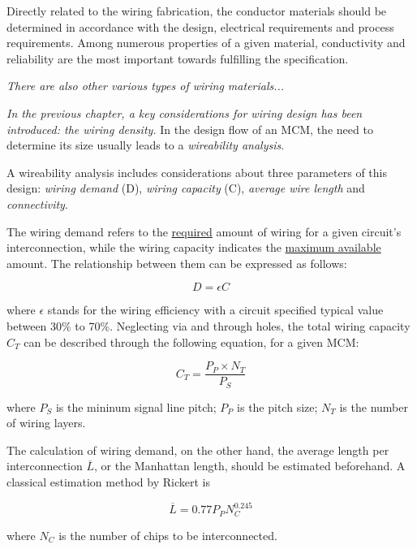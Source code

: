 \begin{spacing}{1.5}
Directly related to the wiring fabrication, the conductor materials should be determined in accordance with the design, electrical requirements and process requirements. Among numerous properties of a given material, conductivity and reliability are the most important towards fulfilling the specification. \cite{chen2006vlsi}

\textit{There are also other various types of wiring materials... }

\textit{In the previous chapter, a key considerations for wiring design has been introduced: the wiring density.} In the design flow of an MCM, the need to determine its size usually leads to a \textit{wireability analysis}. 

A wireability analysis includes considerations about three parameters of this design: \textit{wiring demand} (D), \textit{wiring capacity} (C), \textit{average wire length} and \textit{connectivity}. 

The wiring demand refers to the \underline{required} amount of wiring for a given circuit's interconnection, while the wiring capacity indicates the \underline{maximum available} amount. The relationship between them can be expressed as follows: 

\begin{equation}
    \label{eq.demand} 
    D=\epsilon C
\end{equation}

where $\epsilon$ stands for the wiring efficiency with a circuit specified typical value between 30\% to 70\%. Neglecting via and through holes, the total wiring capacity $C_T$ can be described through the following equation, for a given MCM: 

\begin{equation}
    \label{eq.capacity}
    C_T=\frac{P_P\times N_T}{P_S}
\end{equation}

where $P_S$ is the mininum signal line pitch; $P_P$ is the pitch size; $N_T$ is the number of wiring layers. 

The calculation of wiring demand, on the other hand, the average length per interconnection $\overline{L}$, or the Manhattan length, should be estimated beforehand. A classical estimation method by Rickert is 

\begin{equation}
    \label{eq.rickert}
    \overline{L}=0.77P_PN_C^{0.245}
\end{equation}

where $N_C$ is the number of chips to be interconnected. \cite{rickert1989design} 


\end{spacing}
